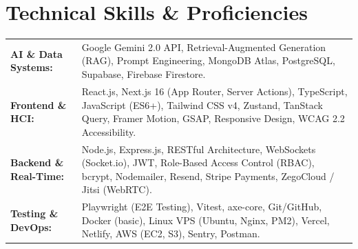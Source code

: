 \documentclass[10pt,a4paper]{article}
\begin{document}
\section{Technical Skills \& Proficiencies}
\begin{tabularx}{\textwidth}{@{}l X@{}}
    \textbf{AI \& Data Systems:} & Google Gemini 2.0 API, Retrieval-Augmented Generation (RAG), Prompt Engineering, MongoDB Atlas, PostgreSQL, Supabase, Firebase Firestore. \\
    \textbf{Frontend \& HCI:} & React.js, Next.js 16 (App Router, Server Actions), TypeScript, JavaScript (ES6+), Tailwind CSS v4, Zustand, TanStack Query, Framer Motion, GSAP, Responsive Design, WCAG 2.2 Accessibility. \\
    \textbf{Backend \& Real-Time:} & Node.js, Express.js, RESTful Architecture, WebSockets (Socket.io), JWT, Role-Based Access Control (RBAC), bcrypt, Nodemailer, Resend, Stripe Payments, ZegoCloud / Jitsi (WebRTC). \\
    \textbf{Testing \& DevOps:} & Playwright (E2E Testing), Vitest, axe-core, Git/GitHub, Docker (basic), Linux VPS (Ubuntu, Nginx, PM2), Vercel, Netlify, AWS (EC2, S3), Sentry, Postman.
\end{tabularx}

\end{document}
